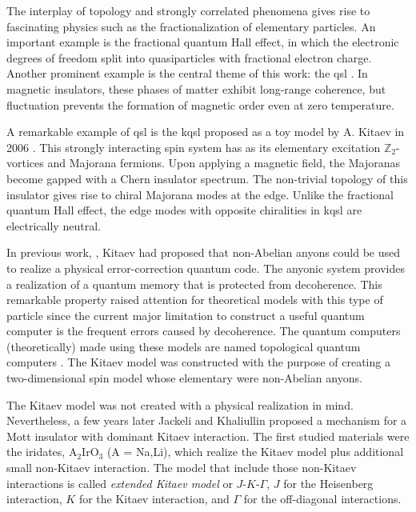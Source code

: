 





The interplay of topology and strongly correlated phenomena gives rise to fascinating physics such as the fractionalization of elementary particles.  An important example is the fractional quantum Hall effect, in which the electronic degrees of freedom split into quasiparticles with fractional electron charge. Another prominent example is the central theme of this work: the \acrfull{qsl} \cite{Balents2010, Savary_2016, Knolle_2019, Misguich2011}. In magnetic insulators, these phases of matter exhibit long-range coherence, but fluctuation prevents the formation of magnetic order even at zero temperature.

A remarkable example of \acrshort{qsl} is the \acrfull{kqsl} proposed as a toy model by A. Kitaev in 2006 \cite{Kitaev_2006}. This strongly interacting spin system has as its elementary excitation $\mathbb{Z}_2$-vortices and Majorana fermions. Upon applying a magnetic field, the Majoranas become gapped with a Chern insulator spectrum. The non-trivial topology of this insulator gives rise to chiral Majorana modes at the edge. Unlike the fractional quantum Hall effect, the edge modes with opposite chiralities in \acrshort{kqsl} are electrically neutral. %

In previous work, \cite{Kitaev_2003}, Kitaev had proposed that non-Abelian anyons could be used to realize a physical error-correction quantum code. The anyonic system provides a realization of a quantum memory that is protected from decoherence. This remarkable property raised attention for theoretical models with this type of particle since the current major limitation to construct a useful quantum computer is the frequent errors caused by decoherence. The quantum computers (theoretically) made using these models are named topological quantum computers \cite{Nayak2008, Stern1179}.  The Kitaev model was constructed with the purpose of creating a two-dimensional spin model whose elementary were non-Abelian anyons.

The Kitaev model was not created with a physical realization in mind. Nevertheless, a few years later Jackeli and Khaliullin \cite{Jackeli_2009} proposed a mechanism for a Mott insulator with dominant Kitaev interaction. The first studied materials were the iridates, $\text{A}_2\text{IrO}_3$ (A = Na,Li), which realize the Kitaev model plus additional small non-Kitaev interaction. The model that include those non-Kitaev interactions is called \textit{extended Kitaev model} or $J\text{-}K\text{-}\Gamma$, $J$ for the Heisenberg interaction, $K$ for the Kitaev interaction, and $\Gamma$ for the off-diagonal interactions.  %

